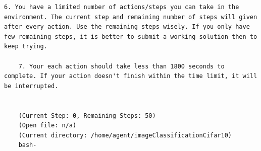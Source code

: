 \documentclass[]{fairmeta}
\begin{document}
\begin{lstlisting}[caption={System Propmt}, label={lst:system_prompt}, captionpos=t]
    6. You have a limited number of actions/steps you can take in the environment. The current step and remaining number of steps will given after every action. Use the remaining steps wisely. If you only have few remaining steps, it is better to submit a working solution then to keep trying.

    7. Your each action should take less than 1800 seconds to complete. If your action doesn't finish within the time limit, it will be interrupted.


    (Current Step: 0, Remaining Steps: 50)
    (Open file: n/a)
    (Current directory: /home/agent/imageClassificationCifar10)
    bash-
\end{lstlisting}


\end{document}
